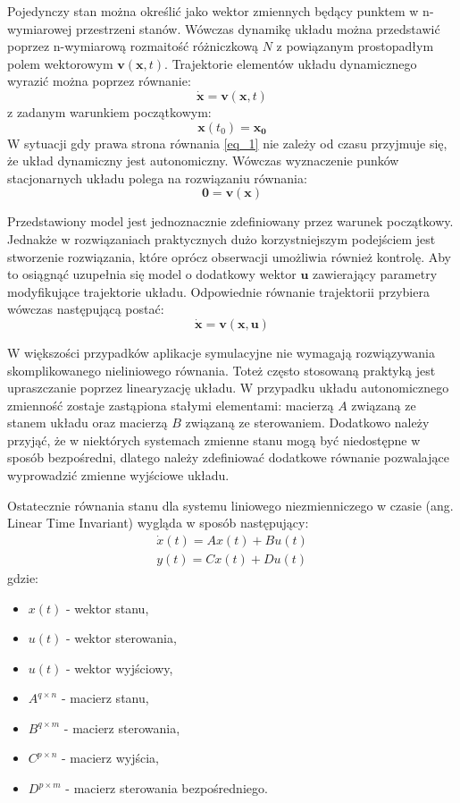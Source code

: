 \documentclass[12pt, oneside]{report}
\theoremstyle{definition}
\begin{document}
Pojedynczy stan można określić jako wektor zmiennych będący punktem w n-wymiarowej przestrzeni stanów. Wówczas dynamikę układu można przedstawić poprzez n-wymiarową rozmaitość różniczkową \(N\) z powiązanym prostopadłym polem wektorowym \(\mathbf{v}(\mathbf{x},t)\). Trajektorie elementów układu dynamicznego wyrazić można poprzez równanie:
\begin{equation} \label{eq_1}
\dot{\mathbf{x}} = \mathbf{v}(\mathbf{x},t)
\end{equation}
z zadanym warunkiem początkowym:
\begin{equation}
\mathbf{x}(t_0) = \mathbf{x_0}
\end{equation}
W sytuacji gdy prawa strona równania \ref{eq_1} nie zależy od czasu przyjmuje się, że układ dynamiczny jest autonomiczny. Wówczas wyznaczenie punków stacjonarnych układu polega na rozwiązaniu równania:
\begin{equation}
\mathbf{0} = \mathbf{v}(\mathbf{x})
\end{equation}

Przedstawiony model jest jednoznacznie zdefiniowany przez warunek początkowy. Jednakże w rozwiązaniach praktycznych dużo korzystniejszym podejściem jest stworzenie rozwiązania, które oprócz obserwacji umożliwia również kontrolę. Aby to osiągnąć uzupełnia się model o dodatkowy wektor \(\mathbf{u}\) zawierający parametry modyfikujące trajektorie układu. Odpowiednie równanie trajektorii przybiera wówczas następującą postać:
\begin{equation}
\dot{\mathbf{x}} = \mathbf{v}(\mathbf{x},\mathbf{u})
\end{equation}

W większości przypadków aplikacje symulacyjne nie wymagają rozwiązywania skomplikowanego nieliniowego równania. Toteż często stosowaną praktyką jest upraszczanie poprzez linearyzację układu. W przypadku układu autonomicznego zmienność zostaje zastąpiona stałymi elementami: macierzą \(A\) związaną ze stanem układu oraz macierzą \(B\) związaną ze sterowaniem. Dodatkowo należy przyjąć, że w niektórych systemach zmienne stanu mogą być niedostępne w sposób bezpośredni, dlatego należy zdefiniować dodatkowe równanie pozwalające wyprowadzić zmienne wyjściowe układu.

Ostatecznie równania stanu dla systemu liniowego niezmienniczego w czasie (ang. Linear Time Invariant) wygląda w sposób następujący:
\begin{gather}
\dot{x}(t) = Ax(t) + Bu(t) \\
y(t) = Cx(t) + Du(t)
\end{gather}
gdzie:
\begin{itemize}
\item \(x(t)\) - wektor stanu,
\item \(u(t)\) - wektor sterowania,
\item \(u(t)\) - wektor wyjściowy,
\item \(A^{q \times n}\) - macierz stanu,
\item \(B^{q \times m}\) - macierz sterowania,
\item \(C^{p \times n}\) - macierz wyjścia,
\item \(D^{p \times m}\) - macierz sterowania bezpośredniego.
\end{itemize}
\end{document}
